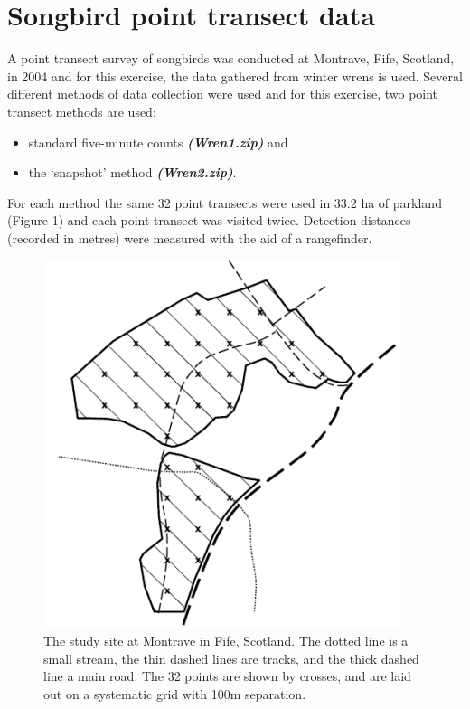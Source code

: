 \documentclass[a4paper, 10pt]{article}
\begin{document}
\section{Songbird point transect data}

A point transect survey of songbirds was conducted at Montrave, Fife, Scotland, in 2004 \citep{buckland2006} and for this exercise, the data gathered from winter wrens is used. Several different methods of data collection were used and for this exercise, two point transect methods are used:

\begin{itemize}
    \item standard five-minute counts \textbf{\emph{(Wren1.zip)}} and
    \item the ‘snapshot’ method \textbf{\emph{(Wren2.zip)}}. 
\end{itemize}

For each method the same 32 point transects were used in 33.2 ha of parkland (Figure 1) and each point transect was visited twice. Detection distances (recorded in metres) were measured with the aid of a rangefinder.

\begin{figure}
\centering
\includegraphics[scale=0.5]{Prac_5_Figure_1.png}
\caption{The study site at Montrave in Fife, Scotland. The dotted line is a small stream, the thin dashed lines are tracks, and the thick dashed line a main road. The 32 points are shown by crosses, and are laid out on a systematic grid with 100m separation.}
\end{figure}
\end{document}
